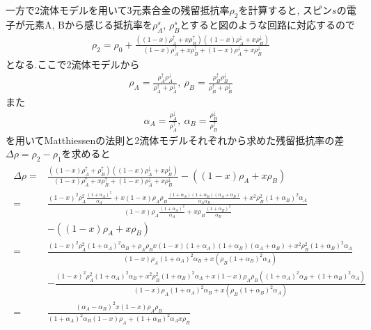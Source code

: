 \documentclass[uplatex,a4j,11pt,dvipdfmx]{jsarticle}
\begin{document}
一方で2流体モデルを用いて3元素合金の残留抵抗率$\rho_2$を計算すると,
スピン$s$の電子が元素A, Bから感じる抵抗率を$\rho_A^s$, $\rho_B^s$とすると図のような回路に対応するので
\begin{align}
  \rho_2=\rho_0+\frac{\left((1-x)\rho_A^\uparrow+x\rho_B^\uparrow\right)\left((1-x)\rho_A^\downarrow+x\rho_B^\downarrow\right)}
  {(1-x)\rho_A^\uparrow+x\rho_B^\uparrow+(1-x)\rho_A^\downarrow+x\rho_B^\downarrow}
\end{align}
となる.ここで2流体モデルから
\begin{align}
  \label{equ2-1}
  \rho_A=\frac{\rho_A^\uparrow\rho_A^\downarrow}{\rho_A^\uparrow+\rho_A^\downarrow},\ 
  \rho_B=\frac{\rho_B^\uparrow\rho_B^\downarrow}{\rho_B^\uparrow+\rho_B^\downarrow}
\end{align}
また
\begin{align}
  \label{equ20}
  \alpha_A=\frac{\rho_A^\downarrow}{\rho_A^\uparrow},\ 
  \alpha_B=\frac{\rho_B^\downarrow}{\rho_B^\uparrow}
\end{align}
を用いてMatthiessenの法則と2流体モデルそれぞれから求めた残留抵抗率の差$\Delta\rho=\rho_2-\rho_1$を求めると
\begin{align}
  \begin{split}
    \label{equ21}
    \Delta\rho=&\frac{\left((1-x)\rho_A^\uparrow+\rho_B^\uparrow\right)\left((1-x)\rho_A^\downarrow+x\rho_B^\downarrow\right)}
    {(1-x)\rho_A^\uparrow+x\rho_B^\uparrow+(1-x)\rho_A^\downarrow+x\rho_B^\downarrow}-\left((1-x)\rho_A+x\rho_B\right)\\
    =&\frac{(1-x)^2\rho_A^2\frac{(1+\alpha_A)^2}{\alpha_A}+x(1-x)\rho_A\rho_B\frac{(1+\alpha_A)(1+\alpha_B)(\alpha_A+\alpha_B)}{\alpha_A\alpha_B}+x^2\rho_B^2(1+\alpha_B)^2\alpha_A}
    {(1-x)\rho_A\frac{(1+\alpha_A)^2}{\alpha_A}+x\rho_B\frac{(1+\alpha_B)^2}{\alpha_B}}\\
    &-\left((1-x)\rho_A+x\rho_B\right)\\
    =&\frac{(1-x)^2\rho_A^2(1+\alpha_A)^2\alpha_B+\rho_A\rho_Bx(1-x)(1+\alpha_A)(1+\alpha_B)(\alpha_A+\alpha_B)+x^2\rho_B^2(1+\alpha_B)^2\alpha_A}{(1-x)\rho_A(1+\alpha_A)^2\alpha_B+x(\rho_B(1+\alpha_B)^2\alpha_A)}\\
    &-\frac{(1-x)^2\rho_A^2(1+\alpha_A)^2\alpha_B+x^2\rho_B^2(1+\alpha_B)^2\alpha_A+x(1-x)\rho_A\rho_B\left((1+\alpha_A)^2\alpha_B+(1+\alpha_B)^2\alpha_A\right)}
    {(1-x)\rho_A(1+\alpha_A)^2\alpha_B+x(\rho_B(1+\alpha_B)^2\alpha_A)}\\
    =&\frac{(\alpha_A-\alpha_B)^2x(1-x)\rho_A\rho_B}{(1+\alpha_A)^2\alpha_B(1-x)\rho_A+(1+\alpha_B)^2\alpha_Ax\rho_B}\\
  \end{split}
\end{align}
\end{document}
